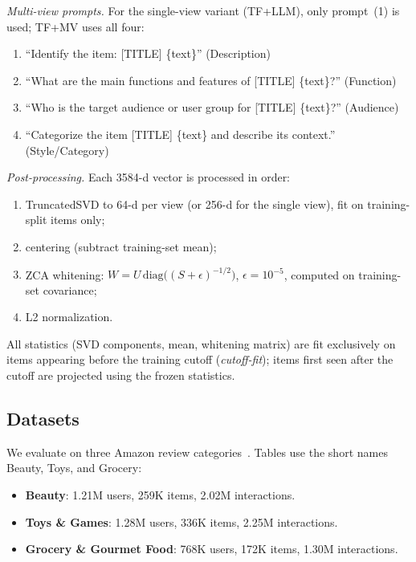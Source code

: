 \documentclass[sigconf,natbib=true,anonymous]{acmart}
\newcommand{\tfllm}{\textsc{TF+LLM}\xspace}
\newcommand{\tfmv}{\textsc{TF+MV}\xspace}
\begin{document}
\smallskip\noindent\emph{Multi-view prompts.}
For the single-view variant (\tfllm), only prompt~(1) is used; \tfmv uses all four:
\begin{enumerate}[leftmargin=2em,itemsep=1pt,label=(\arabic*)]
\item ``Identify the item: [TITLE] \{text\}'' \hfill (Description)
\item ``What are the main functions and features of [TITLE] \{text\}?'' \hfill (Function)
\item ``Who is the target audience or user group for [TITLE] \{text\}?'' \hfill (Audience)
\item ``Categorize the item [TITLE] \{text\} and describe its context.'' \hfill (Style/Category)
\end{enumerate}

\smallskip\noindent\emph{Post-processing.}
Each 3584-d vector is processed in order:
\begin{enumerate}[leftmargin=2em,itemsep=1pt,label=(\roman*)]
\item TruncatedSVD to 64-d per view (or 256-d for the single view), fit on training-split items only;
\item centering (subtract training-set mean);
\item ZCA whitening: $W = U\,\mathrm{diag}\bigl((S + \epsilon)^{-1/2}\bigr)$, $\epsilon{=}10^{-5}$, computed on training-set covariance;
\item L2 normalization.
\end{enumerate}
All statistics (SVD components, mean, whitening matrix) are fit exclusively on items appearing before the training cutoff (\emph{cutoff-fit}); items first seen after the cutoff are projected using the frozen statistics.

\subsection{Datasets}

We evaluate on three Amazon review categories~\cite{mcauley2015amazon,ni2019amazon}.
Tables use the short names Beauty, Toys, and Grocery:
\begin{itemize}[leftmargin=*,itemsep=1pt]
\item \textbf{Beauty}: 1.21M users, 259K items, 2.02M interactions.
\item \textbf{Toys \& Games}: 1.28M users, 336K items, 2.25M interactions.
\item \textbf{Grocery \& Gourmet Food}: 768K users, 172K items, 1.30M interactions.
\end{itemize}
\end{document}
